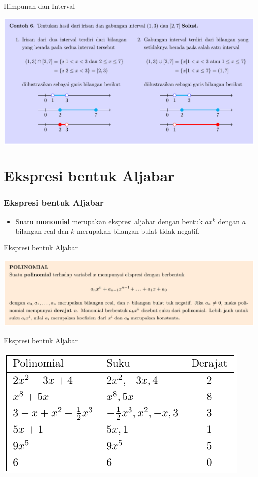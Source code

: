 \documentclass[pdflatex,compress,mathserif]{beamer}
\begin{document}
\begin{frame}{Himpunan dan Interval}
	\begin{center}
		\includegraphics[width=\linewidth]{img/img18}
	\end{center}
\end{frame}

\section{Ekspresi bentuk Aljabar}

\begin{frame}
	\frametitle{Ekspresi bentuk Aljabar}
	\begin{itemize}
		\item Suatu \textbf{monomial} merupakan ekspresi aljabar dengan bentuk $ax^k$ dengan $a$ bilangan real dan $k$ merupakan bilangan bulat tidak negatif.
	\end{itemize}
\end{frame}

\begin{frame}{Ekspresi bentuk Aljabar}
	\begin{center}
		\includegraphics[width=\linewidth]{img/img19}
	\end{center}
\end{frame}

\begin{frame}{Ekspresi bentuk Aljabar}
	\begin{center}
		\includegraphics[width=0.7\linewidth]{img/img20}
	\end{center}
\end{frame}
\end{document}
